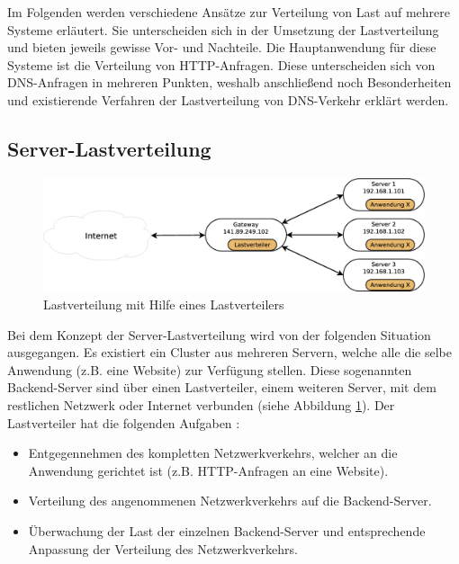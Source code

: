 \documentclass[a4paper, 12pt, BCOR10mm, DIV12, toc=bibliography, toc=listof, german]{scrbook}
\begin{document}
		Im Folgenden werden verschiedene Ansätze zur Verteilung von Last auf mehrere Systeme erläutert.
		Sie unterscheiden sich in der Umsetzung der Lastverteilung und bieten jeweils gewisse Vor- und
		Nachteile. Die Hauptanwendung für diese Systeme ist die Verteilung von HTTP-Anfragen.
		Diese unterscheiden sich von DNS-Anfragen in mehreren Punkten, weshalb anschließend noch
		Besonderheiten und existierende Verfahren der Lastverteilung von DNS-Verkehr erklärt werden.
	
			\subsection{Server-Lastverteilung} %
			\label{sub:Server-Lastverteilung}
			
			\begin{figure}
				\centering
				\includegraphics[width=\textwidth]{images/loadbalancer}
				\caption{Lastverteilung mit Hilfe eines Lastverteilers}
				\label{fig:loadbalancer}
			\end{figure}

			Bei dem Konzept der Server-Lastverteilung wird von der folgenden Situation ausgegangen.  Es
			existiert ein Cluster aus mehreren Servern, welche alle die selbe Anwendung (z.B. eine
			Website) zur Verfügung stellen. Diese sogenannten Backend-Server sind über einen
			Lastverteiler, einem weiteren Server, mit dem restlichen Netzwerk oder Internet verbunden
			(siehe Abbildung \ref{fig:loadbalancer}). Der Lastverteiler hat die folgenden Aufgaben
			\cite{bourke2001}:

			\begin{itemize}
				\item Entgegennehmen des kompletten Netzwerkverkehrs, welcher an die Anwendung gerichtet ist
					(z.B. HTTP-Anfragen an eine Website).
				\item Verteilung des angenommenen Netzwerkverkehrs auf die Backend-Server.
				\item Überwachung der Last der einzelnen Backend-Server und entsprechende Anpassung der
					Verteilung des Netzwerkverkehrs.
			\end{itemize}
\end{document}

